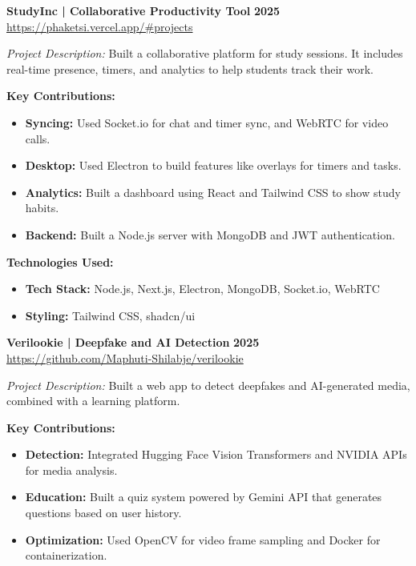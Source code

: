 \documentclass[a4paper,10pt]{article}
\begin{document}
\vspace{8pt}

\textbf{StudyInc | Collaborative Productivity Tool} \hfill \textbf{2025}\\
\small\url{https://phaketsi.vercel.app/#projects}

\textit{Project Description:} 
Built a collaborative platform for study sessions. It includes real-time presence, timers, and analytics to help students track their work.

\textbf{Key Contributions:}
\begin{itemize}
    \item \textbf{Syncing:} Used Socket.io for chat and timer sync, and WebRTC for video calls.
    \item \textbf{Desktop:} Used Electron to build features like overlays for timers and tasks.
    \item \textbf{Analytics:} Built a dashboard using React and Tailwind CSS to show study habits.
    \item \textbf{Backend:} Built a Node.js server with MongoDB and JWT authentication.
\end{itemize}

\textbf{Technologies Used:}
\begin{itemize}
    \item \textbf{Tech Stack:} Node.js, Next.js, Electron, MongoDB, Socket.io, WebRTC
    \item \textbf{Styling:} Tailwind CSS, shadcn/ui
\end{itemize}

\vspace{8pt}

\textbf{Verilookie | Deepfake and AI Detection} \hfill \textbf{2025}\\
\small\url{https://github.com/Maphuti-Shilabje/verilookie}

\textit{Project Description:} 
Built a web app to detect deepfakes and AI-generated media, combined with a learning platform.

\textbf{Key Contributions:}
\begin{itemize}
    \item \textbf{Detection:} Integrated Hugging Face Vision Transformers and NVIDIA APIs for media analysis.
    \item \textbf{Education:} Built a quiz system powered by Gemini API that generates questions based on user history.
    \item \textbf{Optimization:} Used OpenCV for video frame sampling and Docker for containerization.
\end{itemize}
\end{document}
